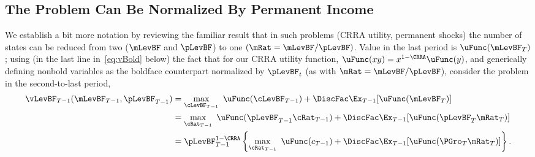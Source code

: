 \documentclass[BufferStockTheory]{subfiles}
\begin{document}
\hypertarget{The-Problem-Can-Be-Rewritten-in-Ratio-Form}{}
\hypertarget{The-Problem-Can-Be-Normalized-By-Permanent-Income}{}
\subsection{The Problem Can Be Normalized By Permanent Income}\label{subsec:ratio}

We establish a bit more notation by reviewing the familiar result that in such problems (CRRA utility, permanent shocks) the number of states can be reduced from two ($\mLevBF$ and $\pLevBF$) to one $(\mRat = \mLevBF/\pLevBF)$.  Value in the last period is $\uFunc(\mLevBF_{T})$; using (in the last line in~\eqref{eq:vBold} below) the fact that for our CRRA utility function, $\uFunc(xy) = x^{1-\CRRA}\uFunc(y)$, and generically defining nonbold variables as the boldface counterpart normalized by $\pLevBF_{t}$ (as with $\mRat=\mLevBF/\pLevBF$), consider the problem in the second-to-last period,
\begin{align}
  \vLevBF_{T-1}(\mLevBF_{T-1},\pLevBF_{T-1})  & =
                                                \max_{\cLevBF_{T-1}}~ \uFunc(\cLevBF_{T-1}) +\DiscFac \Ex_{T-1} [ \uFunc(\mLevBF_{T})]
                                                \notag \\
                                              & =  \max_{\cRat_{T-1}}~
                                                \uFunc(\pLevBF_{T-1}\cRat_{T-1}) + \DiscFac  \Ex_{T-1} [\uFunc(\pLevBF_{T}{\mRat}
                                                _{T})]  \notag \\
                                              & = \pLevBF_{T-1}^{1-\CRRA}
                                                \left\{\max_{\cRat_{T-1}}~ \uFunc(c_{T-1}) + \DiscFac \Ex_{T-1} [ \uFunc( {\PGro}_{T}
                                                {\mRat}_{T}) ] \right\}.   \label{eq:vBold}
\end{align}

\hypertarget{The-Related-Problem}{}
\end{document}
